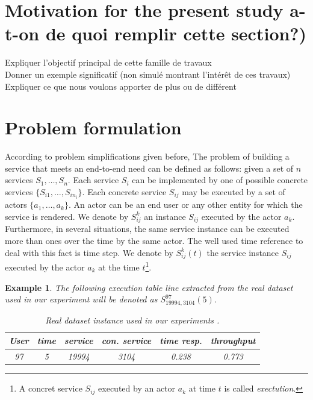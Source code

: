 \documentclass[10pt,journal,compsoc]{IEEEtran}
\newtheorem{example}{Example}
\begin{document}
\section{Motivation for the present study a-t-on de quoi remplir cette section?)}

Expliquer l'objectif principal de cette famille de travaux \\
Donner un exemple significatif (non simul\' e montrant l'int\'er\^et de ces travaux)\\
Expliquer ce que nous voulons apporter de plus ou de diff\'erent

\section{Problem formulation}
According to problem simplifications given before, The problem of building a service that meets an end-to-end need can be defined as follows: given a set of $n$ services $S_1,\dots, S_n$. Each service $S_i$ can be implemented by one of possible concrete services $\{ S_{i1}, \dots, S_{in_i}\}$. Each concrete service $S_{ij}$ may be executed by a set of actors $\{a_1, \dots, a_k\}$. An actor can be an end user or any other entity for which the service is rendered. We denote by  $S_{ij}^k$ an instance $S_{ij}$ executed by the actor $a_k$. Furthermore, in several situations, the same service instance can be executed more than ones over the time by the same actor. The well used time reference to deal with this fact is time step.   We denote by $S_{ij}^k(t)$  the service instance $S_{ij}$ executed by the actor $a_k$ at the time $t$\footnote{A concret service $S_{ij}$ executed by an actor $a_k$ at time $t$ is called {\it exectution}.}. 
\begin{example} The following execution table line extracted from the real dataset used in our experiment will be denoted as $S_{19994,3104}^{97}(5)$.
\begin{table}[htp]
\caption{Real dataset instance used in our experiments \cite{sourceDesDonnees}.}
\begin{center}
\begin{tabular}{|c|c|c|c|c|c|}
\hline
User&time&service&con. service& time resp.& throughput  \\
\hline
97& 5& 19994& 3104&0.238&0.773\\
\hline
\end{tabular}
\end{center}
\label{default}
\end{table}%

\end{example}
\end{document}
